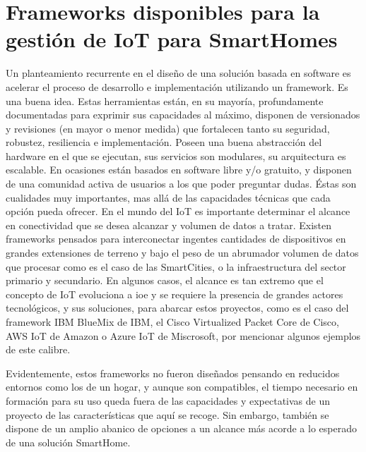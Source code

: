 \section{Frameworks disponibles para la gestión de IoT para SmartHomes}
\label{ch:Capitulo2.2}

Un planteamiento recurrente en el diseño de una solución basada en software es acelerar el proceso de desarrollo e implementación utilizando un framework. Es una buena idea. Estas herramientas están, en su mayoría, profundamente documentadas para exprimir sus capacidades al máximo, disponen de versionados y revisiones (en mayor o menor medida) que fortalecen tanto su seguridad, robustez, resiliencia e implementación. Poseen una buena abstracción del hardware en el que se ejecutan, sus servicios son modulares, su arquitectura es escalable.  En ocasiones están basados en software libre y/o gratuito, y disponen de una comunidad activa de usuarios a los que poder preguntar dudas. Éstas son cualidades muy importantes, mas allá de las capacidades técnicas que cada opción pueda ofrecer.
En el mundo del IoT es importante determinar el alcance en conectividad que se desea alcanzar y volumen de datos a tratar. Existen frameworks pensados para interconectar ingentes cantidades de dispositivos en grandes extensiones de terreno y bajo el peso de un abrumador volumen de datos que procesar como es el caso de las SmartCities, o la infraestructura del sector primario y secundario. En algunos casos, el alcance es tan extremo que el concepto de IoT evoluciona a \gls{ioe} y se requiere la presencia de grandes actores tecnológicos, y sus soluciones, para abarcar estos proyectos, como es el caso del framework IBM BlueMix de IBM, el Cisco Virtualized Packet Core de Cisco, AWS IoT de Amazon o Azure IoT de Miscrosoft, por mencionar algunos ejemplos de este calibre.

\vspace{1cm}

Evidentemente, estos frameworks no fueron diseñados pensando en reducidos entornos como los de un hogar, y aunque son compatibles, el tiempo necesario en formación para su uso queda fuera de las capacidades y expectativas de un proyecto de las características que aquí se recoge. Sin embargo, también se dispone de un amplio abanico de opciones a un alcance más acorde a lo esperado de una solución SmartHome.

\vspace{1cm}


